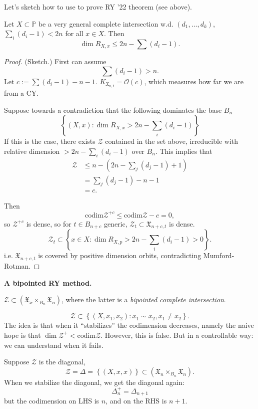 \noindent
Let's sketch how to use to prove
RY '22 theorem (see above).

\begin{theorem}[RY 22]
\label{theorem-ry22}
Let $X \subset \mathbb{P}$ be a very general
complete intersection w.d. $(d_1,…,d_k)$,
$\sum_i(d_i-1)<2n$ for all $x \in X$.
Then 
$$
\dim R_{X,x} \leq  2n- 
\sum (d_i-1).
$$
\end{theorem}

\begin{proof}
(Sketch.)
First can assume
$$
\sum(d_i-1) > n.
$$
Let $c:= \sum (d_i-1)-n-1$.
$K_{\mathfrak{X}_{n,t}}=\mathcal{O}(c)$,
which measures how far we are from a CY.

Suppose towards a contradiction that
the following dominates the base $B_n$
$$
\left\{(X,x): \dim R_{X,x} > 2n -
\sum_i(d_i-1)\right\}
$$
If this is the case, there exists
$\mathcal{Z}$ contained in the set above, 
irreducible with relative dimension
$> 2n - \sum_i (d_i-1)$ over $B_n$.
This implies that
$$
\begin{aligned}
\mathcal{Z}&\leq  n- \left(2n
-\sum_j(d_j-1)+1\right)\\
&=\sum_{j}(d_j-1)-n-1\\
&=c.
\end{aligned}
$$

\noindent
Then
$$
\text{codim}\mathcal{Z}^{+c}
\leq  \text{codim} \mathcal{Z} -c
=0,
$$
so $\mathcal{Z}^{+c}$ is dense,
so for $t \in B_{n+c}$ generic,
$\mathcal{Z}_t \subset \mathfrak{X}_{n+c,t}$
is dense.
$$
\mathcal{Z}_t \subset
\left\{x \in X:
\dim R_{X,p}>2n
-\sum_i (d_i-1)>0\right\}.
$$
i.e. $\mathfrak{X}_{n+c,t}$
is covered by positive dimension
orbits, contradicting
Mumford-Rotman.
\end{proof}

\medskip\noindent
{\bf A bipointed RY method.} 

$\mathcal{Z} \subset (\mathfrak{X}_x
\times_{B_n}\mathfrak{X}_n)$,
where the latter is a
{\it bipointed complete intersection}.

$$
\mathcal{Z} \subset
\left\{(X,x_1,x_2)
:x_1 \sim x_2,
x_1 \neq  x_2\right\}.
$$
The idea is that when it
``stabilizes'' the codimension decreases,
namely the naive hope is that
$\dim \mathcal{Z}^+ < \text{codim}
\mathcal{Z}$.
However, this is false. But in a controllable
way: we can understand when it fails.

\begin{example}
\label{example-situations-when-fails}
Suppose $\mathcal{Z}$ is the diagonal,
$$
\mathcal{Z}= \Delta=
\left\{(X,x,x)\right\} \subset
(\mathfrak{X}_n \times_{B_n}
\mathfrak{X}_n).
$$
When we stabilize the diagonal,
we get the diagonal again:
$$
\Delta^+_n = \Delta_{n+1}
$$
but the codimension on LHS is $n$,
and on the RHS is $n+1$.
\end{example}

